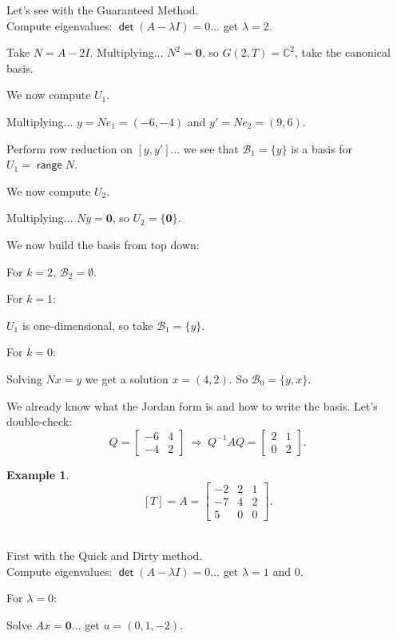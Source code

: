 \documentclass[11pt]{article}
\newcommand{\1}{\mathbf{1}}
\newcommand{\0}{\mathbf{0}}
\newcommand{\B}{\mathcal{B}}
\newcommand{\C}{\mathbb{C}}
\DeclareMathOperator{\myrange}{\mathsf{range}}
\DeclareMathOperator{\mydet}{\mathsf{det}}
\theoremstyle{definition}
\newtheorem{example}{Example}
\begin{document}
Let's see with the Guaranteed Method.
\\

Compute eigenvalues: $ \mydet(A-\lambda I)=0 $... get $\lambda=2$.

Take $N=A-2I$.
Multiplying... $N^2 = \0$, so $G(2,T)=\C^2$, take the canonical basis.

We now compute $U_1$.

Multiplying... $y = Ne_1 = (-6,-4)$ and $y' = Ne_2 = (9,6)$.

Perform row reduction on $[y,y']$... we see that $\B_1=\{y\}$ is a basis for $U_1 = \myrange N$.

We now compute $U_2$.

Multiplying... $Ny = \0$, so $U_2 = \{\0\}$.

We now build the basis from top down:

For $k=2$, $\B_2 = \emptyset$.

For $k = 1$:

$U_1$ is one-dimensional, so take $\B_1 = \{y\}$.

For $k=0$:

Solving $Nx = y$ we get a solution $x=(4,2)$.
So ${\B_0}=\{y,x\}$.

We already know what the Jordan form is and how to write the basis.
Let's double-check:
\[
Q=
\begin{bmatrix}
-6 & 4 \\
-4 & 2
\end{bmatrix}
\
\Longrightarrow
\
Q^{-1}AQ = 
\begin{bmatrix}
2 & 1 \\
0 & 2
\end{bmatrix}
.
\]


\clearpage

\begin{example}
\[
[T]=
A=
\begin{bmatrix}
-2 & 2 & 1 \\
-7 & 4 & 2 \\
5 & 0 & 0
\end{bmatrix}
.
\]
\\
\end{example}

First with the Quick and Dirty method.
\\

Compute eigenvalues: $ \mydet(A-\lambda I)=0 $... get $\lambda=1$ and $0$.

For $\lambda=0$:

Solve $Ax=\0$... get $u=(0,1,-2)$.
\end{document}
